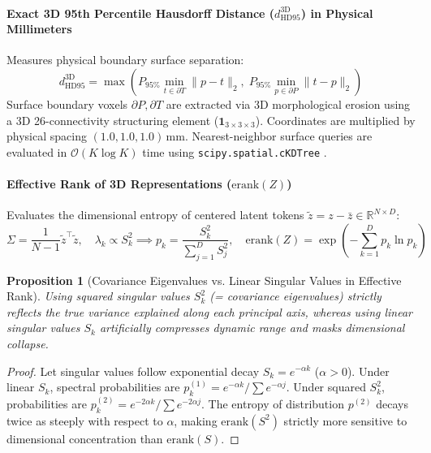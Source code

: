 \documentclass{article}
\newtheorem{proposition}{Proposition}
\begin{document}
\paragraph{Exact 3D 95th Percentile Hausdorff Distance ($d_{\text{HD95}}^{3\text{D}}$) in Physical Millimeters}
Measures physical boundary surface separation:
\begin{equation}
    d_{\text{HD95}}^{3\text{D}} = \max\left( P_{95\%} \min_{t \in \partial T} \|p - t\|_2, \; P_{95\%} \min_{p \in \partial P} \|t - p\|_2 \right)
\end{equation}
Surface boundary voxels $\partial P, \partial T$ are extracted via 3D morphological erosion using a 3D 26-connectivity structuring element ($\mathbf{1}_{3 \times 3 \times 3}$). Coordinates are multiplied by physical spacing $(1.0, 1.0, 1.0)\,\text{mm}$. Nearest-neighbor surface queries are evaluated in $\mathcal{O}(K \log K)$ time using \texttt{scipy.spatial.cKDTree} \citep{taha2015metrics,huttenlocher1993comparing}.

\paragraph{Effective Rank of 3D Representations ($\text{erank}(Z)$)}
Evaluates the dimensional entropy of centered latent tokens $\tilde{z} = z - \bar{z} \in \mathbb{R}^{N \times D}$:
\begin{equation}
    \Sigma = \frac{1}{N - 1} \tilde{z}^\top \tilde{z}, \quad \lambda_k \propto S_k^2 \implies p_k = \frac{S_k^2}{\sum_{j=1}^D S_j^2}, \quad \text{erank}(Z) = \exp\left( - \sum_{k=1}^D p_k \ln p_k \right)
\end{equation}

\begin{proposition}[Covariance Eigenvalues vs. Linear Singular Values in Effective Rank]
\label{prop:effective_rank_sq}
Using squared singular values $S_k^2$ (= covariance eigenvalues) strictly reflects the true variance explained along each principal axis, whereas using linear singular values $S_k$ artificially compresses dynamic range and masks dimensional collapse.
\end{proposition}

\begin{proof}
Let singular values follow exponential decay $S_k = e^{-\alpha k}$ ($\alpha > 0$). Under linear $S_k$, spectral probabilities are $p_k^{(1)} = e^{-\alpha k} / \sum e^{-\alpha j}$. Under squared $S_k^2$, probabilities are $p_k^{(2)} = e^{-2\alpha k} / \sum e^{-2\alpha j}$. The entropy of distribution $p^{(2)}$ decays twice as steeply with respect to $\alpha$, making $\text{erank}(S^2)$ strictly more sensitive to dimensional concentration than $\text{erank}(S)$.
\end{proof}
\end{document}
